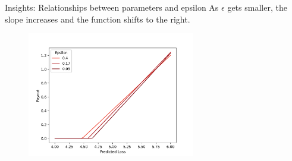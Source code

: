 \documentclass{beamer}
\begin{document}
\begin{frame}{Insights: Relationships between parameters and epsilon}
\label{eps-relationship}
As $\epsilon$ gets smaller, the slope increases and the function shifts to the right. 
\begin{figure}
\centering
  \includegraphics[width=0.65\textwidth, height=0.5\textwidth]{payout_vs_epsilon.png}
\end{figure}
    
\end{frame}
\end{document}

